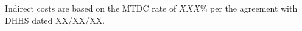 \bigskip
{} 

\bigskip
{} 

\bigskip
{} 

\bigskip
{} 

\bigskip
{} 

\bigskip
{} 

\bigskip
{} 

Indirect costs are based on the MTDC rate of $XXX\%$ per the
agreement with DHHS dated XX/XX/XX.